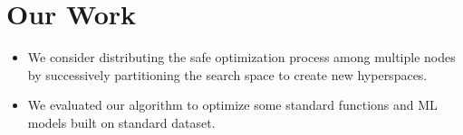 \section{Our Work}
\label{sec:our-contribution}
\begin{itemize}
	\item We consider distributing the safe optimization process among multiple nodes by successively partitioning the search space to create new hyperspaces.
	\item 	We evaluated our algorithm to optimize some standard functions and ML models built on standard dataset.
\end{itemize}


